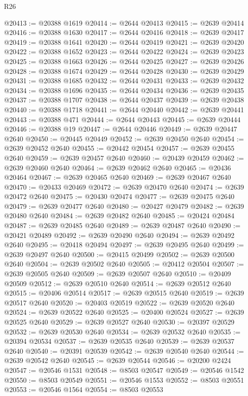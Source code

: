\begin{lexlean}{R26}
\begin{coremodule}
@20413 := @20388 @1619
@20414 := @2644 @20413
@20415 := @2639 @20414
@20416 := @20388 @1630
@20417 := @2644 @20416
@20418 := @2639 @20417
@20419 := @20388 @1641
@20420 := @2644 @20419
@20421 := @2639 @20420
@20422 := @20388 @1652
@20423 := @2644 @20422
@20424 := @2639 @20423
@20425 := @20388 @1663
@20426 := @2644 @20425
@20427 := @2639 @20426
@20428 := @20388 @1674
@20429 := @2644 @20428
@20430 := @2639 @20429
@20431 := @20388 @1685
@20432 := @2644 @20431
@20433 := @2639 @20432
@20434 := @20388 @1696
@20435 := @2644 @20434
@20436 := @2639 @20435
@20437 := @20388 @1707
@20438 := @2644 @20437
@20439 := @2639 @20438
@20440 := @20388 @1718
@20441 := @2644 @20440
@20442 := @2639 @20441
@20443 := @20388 @471
@20444 := @2644 @20443
@20445 := @2639 @20444
@20446 := @20388 @19
@20447 := @2644 @20446
@20449 := @2639 @20447 @2640
@20450 := @20445 @20449
@20452 := @2639 @20450 @2640
@20454 := @2639 @20452 @2640
@20455 := @20442 @20454
@20457 := @2639 @20455 @2640
@20459 := @2639 @20457 @2640
@20460 := @20439 @20459
@20462 := @2639 @20460 @2640
@20464 := @2639 @20462 @2640
@20465 := @20436 @20464
@20467 := @2639 @20465 @2640
@20469 := @2639 @20467 @2640
@20470 := @20433 @20469
@20472 := @2639 @20470 @2640
@20474 := @2639 @20472 @2640
@20475 := @20430 @20474
@20477 := @2639 @20475 @2640
@20479 := @2639 @20477 @2640
@20480 := @20427 @20479
@20482 := @2639 @20480 @2640
@20484 := @2639 @20482 @2640
@20485 := @20424 @20484
@20487 := @2639 @20485 @2640
@20489 := @2639 @20487 @2640
@20490 := @20421 @20489
@20492 := @2639 @20490 @2640
@20494 := @2639 @20492 @2640
@20495 := @20418 @20494
@20497 := @2639 @20495 @2640
@20499 := @2639 @20497 @2640
@20500 := @20415 @20499
@20502 := @2639 @20500 @2640
@20504 := @2639 @20502 @2640
@20505 := @20412 @20504
@20507 := @2639 @20505 @2640
@20509 := @2639 @20507 @2640
@20510 := @20409 @20509
@20512 := @2639 @20510 @2640
@20514 := @2639 @20512 @2640
@20515 := @20406 @20514
@20517 := @2639 @20515 @2640
@20519 := @2639 @20517 @2640
@20520 := @20403 @20519
@20522 := @2639 @20520 @2640
@20524 := @2639 @20522 @2640
@20525 := @20400 @20524
@20527 := @2639 @20525 @2640
@20529 := @2639 @20527 @2640
@20530 := @20397 @20529
@20532 := @2639 @20530 @2640
@20534 := @2639 @20532 @2640
@20535 := @20394 @20534
@20537 := @2639 @20535 @2640
@20539 := @2639 @20537 @2640
@20540 := @20391 @20539
@20542 := @2639 @20540 @2640
@20544 := @2639 @20542 @2640
@20545 := @2639 @20544
@20546 := @20200 @2424
@20547 := @20546 @1531
@20548 := @8503 @20547
@20549 := @20546 @1542
@20550 := @8503 @20549
@20551 := @20546 @1553
@20552 := @8503 @20551
@20553 := @20546 @1564
@20554 := @8503 @20553

\end{coremodule}
\end{lexlean}
